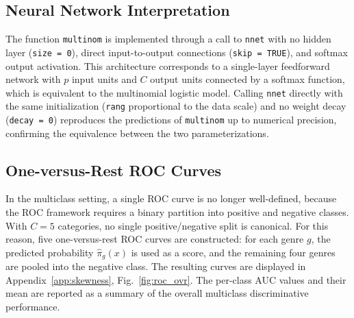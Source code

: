 \subsection{Neural Network Interpretation}

The function \texttt{multinom} is implemented through a call to \texttt{nnet} with no hidden layer (\texttt{size = 0}), direct input-to-output connections (\texttt{skip = TRUE}), and softmax output activation. This architecture corresponds to a single-layer feedforward network with \(p\) input units and \(C\) output units connected by a softmax function, which is equivalent to the multinomial logistic model. Calling \texttt{nnet} directly with the same initialization (\texttt{rang} proportional to the data scale) and no weight decay (\texttt{decay = 0}) reproduces the predictions of \texttt{multinom} up to numerical precision, confirming the equivalence between the two parameterizations.

\subsection{One-versus-Rest ROC Curves}

In the multiclass setting, a single ROC curve is no longer well-defined, because the ROC framework requires a binary partition into positive and negative classes. With \(C = 5\) categories, no single positive/negative split is canonical. For this reason, five one-versus-rest ROC curves are constructed: for each genre \(g\), the predicted probability \(\hat{\pi}_g(x)\) is used as a score, and the remaining four genres are pooled into the negative class. The resulting curves are displayed in Appendix~\ref{app:skewness}, Fig.~\ref{fig:roc_ovr}. The per-class AUC values and their mean are reported as a summary of the overall multiclass discriminative performance.
